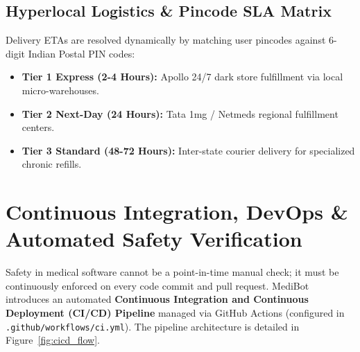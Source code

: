 \documentclass[11pt,a4paper]{article}
\begin{document}
\subsection{Hyperlocal Logistics \& Pincode SLA Matrix}
Delivery ETAs are resolved dynamically by matching user pincodes against 6-digit Indian Postal PIN codes:
\begin{itemize}[leftmargin=*]
  \item \textbf{Tier 1 Express (2-4 Hours):} Apollo 24/7 dark store fulfillment via local micro-warehouses.
  \item \textbf{Tier 2 Next-Day (24 Hours):} Tata 1mg / Netmeds regional fulfillment centers.
  \item \textbf{Tier 3 Standard (48-72 Hours):} Inter-state courier delivery for specialized chronic refills.
\end{itemize}

\section{Continuous Integration, DevOps \& Automated Safety Verification}

Safety in medical software cannot be a point-in-time manual check; it must be continuously enforced on every code commit and pull request. MediBot introduces an automated \textbf{Continuous Integration and Continuous Deployment (CI/CD) Pipeline} managed via GitHub Actions (configured in \texttt{.github/workflows/ci.yml}). The pipeline architecture is detailed in Figure~\ref{fig:cicd_flow}.
\end{document}
